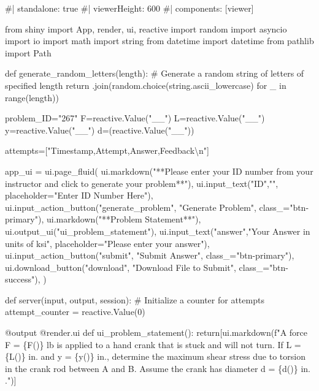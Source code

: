 \documentclass[
  letterpaper,
  DIV=11,
  numbers=noendperiod]{scrreprt}
\newenvironment{Shaded}{\begin{snugshade}}{\end{snugshade}}
\newcommand{\NormalTok}[1]{\textcolor[rgb]{0.00,0.23,0.31}{#1}}
\begin{document}
\begin{Shaded}
\begin{Highlighting}[]
\NormalTok{\#| standalone: true}
\NormalTok{\#| viewerHeight: 600}
\NormalTok{\#| components: [viewer]}

\NormalTok{from shiny import App, render, ui, reactive}
\NormalTok{import random}
\NormalTok{import asyncio}
\NormalTok{import io}
\NormalTok{import math}
\NormalTok{import string}
\NormalTok{from datetime import datetime}
\NormalTok{from pathlib import Path}

\NormalTok{def generate\_random\_letters(length):}
\NormalTok{    \# Generate a random string of letters of specified length}
\NormalTok{    return \textquotesingle{}\textquotesingle{}.join(random.choice(string.ascii\_lowercase) for \_ in range(length)) }

\NormalTok{problem\_ID="267"}
\NormalTok{F=reactive.Value("\_\_")}
\NormalTok{L=reactive.Value("\_\_")}
\NormalTok{y=reactive.Value("\_\_")}
\NormalTok{d=(reactive.Value("\_\_"))}

\NormalTok{attempts=["Timestamp,Attempt,Answer,Feedback\textbackslash{}n"]}

\NormalTok{app\_ui = ui.page\_fluid(}
\NormalTok{    ui.markdown("**Please enter your ID number from your instructor and click to generate your problem**"),}
\NormalTok{    ui.input\_text("ID","", placeholder="Enter ID Number Here"),}
\NormalTok{    ui.input\_action\_button("generate\_problem", "Generate Problem", class\_="btn{-}primary"),}
\NormalTok{    ui.markdown("**Problem Statement**"),}
\NormalTok{    ui.output\_ui("ui\_problem\_statement"),}
\NormalTok{    ui.input\_text("answer","Your Answer in units of ksi", placeholder="Please enter your answer"),}
\NormalTok{    ui.input\_action\_button("submit", "Submit Answer", class\_="btn{-}primary"),}
\NormalTok{    ui.download\_button("download", "Download File to Submit", class\_="btn{-}success"),}
\NormalTok{)}


\NormalTok{def server(input, output, session):}
\NormalTok{    \# Initialize a counter for attempts}
\NormalTok{    attempt\_counter = reactive.Value(0)}

\NormalTok{    @output}
\NormalTok{    @render.ui}
\NormalTok{    def ui\_problem\_statement():}
\NormalTok{        return[ui.markdown(f"A force F = \{F()\} lb is applied to a hand crank that is stuck and will not turn. If L = \{L()\} in. and y = \{y()\} in., determine the maximum shear stress due to torsion in the crank rod between A and B. Assume the crank has diameter d = \{d()\} in. .")]}
    

\end{Highlighting}
\end{Shaded}
\end{document}

